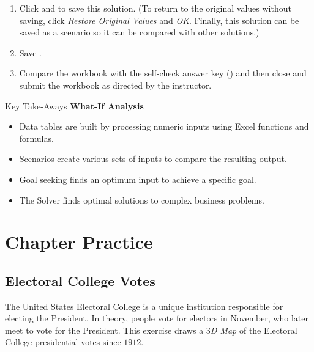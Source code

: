 \begin{enumbox}
	\begin{enumerate}
		\item Click  and  to save this solution. (To return to the original values without saving, click \textit{Restore Original Values} and \textit{OK}. Finally, this solution can be saved as a scenario so it can be compared with other solutions.)
		\item Save .
		\item Compare the workbook with the self-check answer key () and then close and submit the  workbook as directed by the instructor.
	\end{enumerate}
\end{enumbox}

\begin{center}
	\begin{tkwbox}{Key Take-Aways}
		\textbf{What-If Analysis}
		\\
		\begin{itemize}
			\setlength{\itemsep}{0pt}
			\setlength{\parskip}{0pt}
			\setlength{\parsep}{0pt}
			
			\item Data tables are built by processing numeric inputs using Excel functions and formulas.
			\item Scenarios create various sets of inputs to compare the resulting output.
			\item Goal seeking finds an optimum input to achieve a specific goal.
			\item The Solver finds optimal solutions to complex business problems.
			
		\end{itemize}
	\end{tkwbox}
\end{center}

\section{Chapter Practice}

\subsection{Electoral College Votes}

The United States Electoral College is a unique institution responsible for electing the President. In theory, people vote for electors in November, who later meet to vote for the President. This exercise draws a \textit{$ 3 $D Map} of the Electoral College presidential votes since $ 1912 $.

